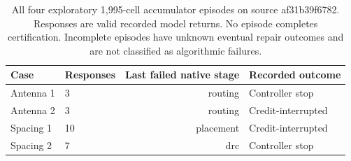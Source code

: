 \begin{table}[htbp]\centering\small\setlength{\tabcolsep}{4pt}
\caption{All four exploratory 1,995-cell accumulator episodes on source af31b39f6782. Responses are valid recorded model returns. No episode completes certification. Incomplete episodes have unknown eventual repair outcomes and are not classified as algorithmic failures.}\label{tab:largerepair}
\begin{tabular}{@{}llrl@{}}\toprule
Case & Responses & Last failed native stage & Recorded outcome \\
\midrule
Antenna 1 & 3 & routing & Controller stop \\
Antenna 2 & 3 & routing & Credit-interrupted \\
Spacing 1 & 10 & placement & Credit-interrupted \\
Spacing 2 & 7 & drc & Controller stop \\
\bottomrule\end{tabular}\end{table}
